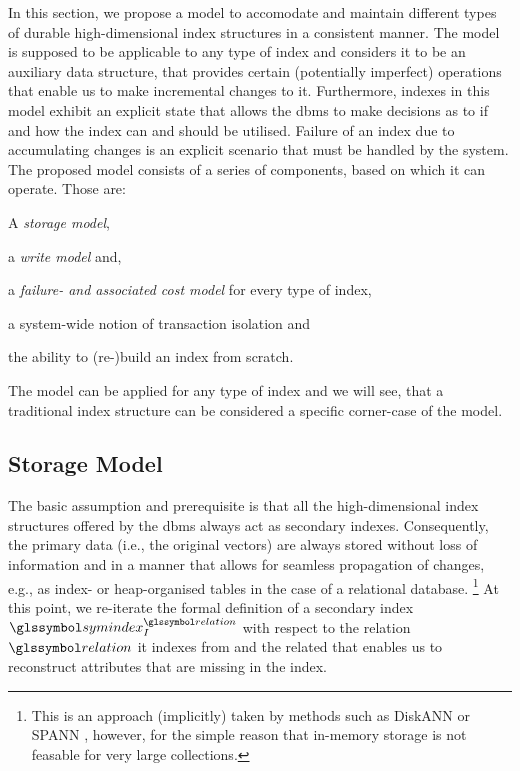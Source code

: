 In this section, we propose a model to accomodate and maintain different types of durable high-dimensional index structures in a consistent manner. The model is supposed to be applicable to any type of index and considers it to be an auxiliary data structure, that provides certain (potentially imperfect) operations that enable us to make incremental changes to it. Furthermore, indexes in this model exhibit an explicit state that allows the \acrshort{dbms} to make decisions as to if and how the index can and should be utilised. Failure of an index due to accumulating changes is an explicit scenario that must be handled by the system. The proposed model consists of a series of components, based on which it can operate. Those are:
\begin{enumerate*}[label=(\roman*)]
    \item A \emph{storage model},
    \item a \emph{write model} and,
    \item a \emph{failure- and associated cost model} for every type of index,
    \item a system-wide notion of transaction isolation and
    \item the ability to (re-)build an index from scratch.
\end{enumerate*} 
The model can be applied for any type of index and we will see, that a traditional index structure can be considered a specific corner-case of the model.

\subsection{Storage Model}

The basic assumption and prerequisite is that all the high-dimensional index structures offered by the \acrshort{dbms} always act as secondary indexes. Consequently, the primary data (i.e., the original vectors) are always stored without loss of information and in a manner that allows for seamless propagation of changes, e.g., as index- or heap-organised tables in the case of a relational database. \footnote{This is an approach (implicitly) taken by methods such as DiskANN \cite{Jayaram:2019DiskANN} or SPANN \cite{Chen:2021SPANN}, however, for the simple reason that in-memory storage is not feasable for very large collections.} At this point, we re-iterate the formal definition of a secondary index $\symindex^{\relation}_I$ with respect to the relation $\relation$ it indexes from  and the related  that enables us to reconstruct attributes that are missing in the index.

